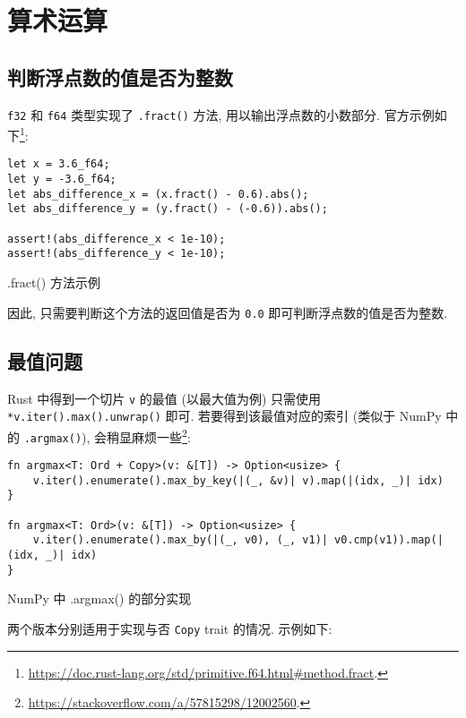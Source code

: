 \documentclass{crbook}
\begin{document}
\newpage
\section{算术运算}
\subsection{判断浮点数的值是否为整数}

\texttt{f32} 和 \texttt{f64} 类型实现了 \texttt{.fract()} 方法, 用以输出浮点数的小数部分. 官方示例如下\footnote{\url{https://doc.rust-lang.org/std/primitive.f64.html\#method.fract}.}:

\begin{listing}
    \linespread{1}
    \begin{verbatim}
let x = 3.6_f64;
let y = -3.6_f64;
let abs_difference_x = (x.fract() - 0.6).abs();
let abs_difference_y = (y.fract() - (-0.6)).abs();

assert!(abs_difference_x < 1e-10);
assert!(abs_difference_y < 1e-10);
    \end{verbatim}
    \caption{.fract() 方法示例}
\end{listing}

因此, 只需要判断这个方法的返回值是否为 \texttt{0.0} 即可判断浮点数的值是否为整数.

\subsection{最值问题}

Rust 中得到一个切片 \texttt{v} 的最值 (以最大值为例) 只需使用 \texttt{*v.iter().max().unwrap()} 即可. 若要得到该最值对应的索引 (类似于 NumPy 中的 \texttt{.argmax()}), 会稍显麻烦一些\footnote{\url{https://stackoverflow.com/a/57815298/12002560}.}:

\begin{listing}
    \linespread{1}
    \begin{verbatim}
fn argmax<T: Ord + Copy>(v: &[T]) -> Option<usize> {
    v.iter().enumerate().max_by_key(|(_, &v)| v).map(|(idx, _)| idx)
}

fn argmax<T: Ord>(v: &[T]) -> Option<usize> {
    v.iter().enumerate().max_by(|(_, v0), (_, v1)| v0.cmp(v1)).map(|(idx, _)| idx)
}
    \end{verbatim}
    \caption{NumPy 中 .argmax() 的部分实现}
\end{listing}

两个版本分别适用于实现与否 \texttt{Copy} trait 的情况. 示例如下:
\end{document}

